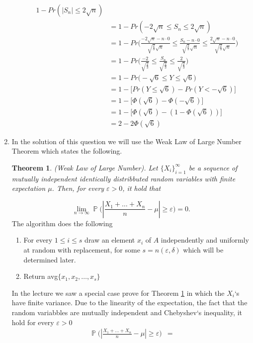 \documentclass[a4paper, 11pt, oneside]{article}
\newtheorem{theorem}{Theorem}[section]
\newcommand\abs[1]{\left|#1\right|}
\DeclareMathOperator{\PX}{\mathbb{P}}
\begin{document}
\begin{enumerate}
\begin{enumerate}
\begin{align*}
 1 - Pr(\abs{S_n} \leq 2\sqrt{n}) \\&=
 1 - Pr(-2\sqrt{n} \leq S_n \leq 2\sqrt{n}) \\&=
 1 - Pr\Bigg(\frac{-2\sqrt{n} - n \cdot 0}{\sqrt{\frac{2}{3}}\sqrt{n}} \leq \frac{S_n - n \cdot 0}{\sqrt{\frac{2}{3}}\sqrt{n}} \leq \frac{2\sqrt{n} - n \cdot 0}{\sqrt{\frac{2}{3}}\sqrt{n}}\Bigg) \\&=
 1 - Pr\Bigg(\frac{-2}{\sqrt{\frac{2}{3}}} \leq \frac{S_n}{\sqrt{\frac{2}{3}}} \leq \frac{2}{\sqrt{\frac{2}{3}}}\Bigg)\\&=
 1 - Pr\Bigg(-\sqrt{6} \leq Y \leq \sqrt{6}\Bigg)\\&=
 1 - \Big[Pr(Y \leq \sqrt{6}) - Pr(Y < -\sqrt{6})\Big] \\&=
 1 - \Big[\Phi(\sqrt{6}) -\Phi(-\sqrt{6})\Big] \\&=
 1 - \Big[\Phi(\sqrt{6}) - (1 - \Phi(\sqrt{6}))\Big] \\&=
 2 - 2\Phi(\sqrt{6})
 \end{align*}
\end{enumerate}
 \item  In the solution of this question we will use the Weak Law of Large Number Theorem which states the following.
\begin{theorem} 
\label{weak}
(Weak Law of Large Number). Let $\{X_i\}^\infty_{i=1}$ be a sequence of mutually independent identically distribbuted random variables with finite
expectation $\mu$. Then, for every $\varepsilon > 0$, it hold that
\end{theorem} 
\begin{equation*}
\lim\limits_{n \to \infty} \PX \Bigg(\abs{\frac{X_1+\ldots+X_n}{n} - \mu}\geq \varepsilon\Bigg) = 0.
 \end{equation*}
 The algorithm does the following
 \begin{enumerate}
\item For every $1 \leq i \leq s$ draw an element $x_i$ of $A$ independently and uniformly at random with replacement, for some $s = n(\varepsilon,\delta)$ which will be determined later. 
\item Return avg$\{x_1,x_2,\ldots,x_s\}$
 \end{enumerate}
In the lecture we saw a special case prove for Theorem \ref{weak} in which the $X_i$`s have finite variance.
Due to the linearity of the expectation, the fact that the random variabbles are mutually independent and Chebyshev`s inequality, it hold for every $\varepsilon > 0$ 
 \begin{align*}
\PX\Big(\abs{\frac{X_1 + \ldots + X_n}{n} - \mu} \geq \varepsilon \Big) &=

\end{align*}
\end{enumerate}
\end{document}

